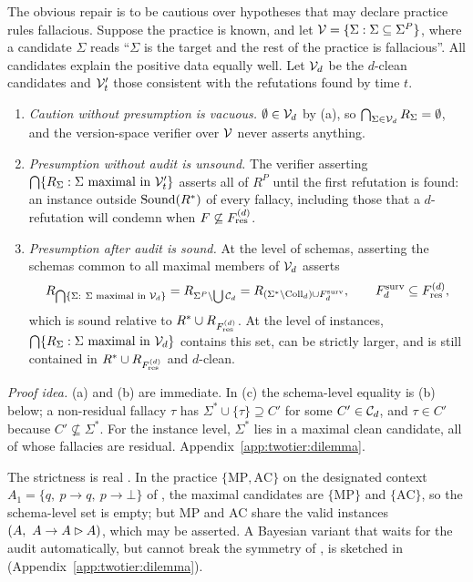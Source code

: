 The obvious repair is to be cautious over hypotheses that may declare practice rules fallacious. Suppose the practice is known, and let $\mathcal{V}=\{\Sigma:\Sigma\subseteq\Sigma^P\}$, where a candidate $\Sigma$ reads ``$\Sigma$ is the target and the rest of the practice is fallacious''. All candidates explain the positive data equally well. Let $\mathcal{V}_d$ be the $d$-clean candidates and $\mathcal{V}'_t$ those consistent with the refutations found by time $t$.

\begin{proposition}\label{prop:twotier:dilemma}
\leavevmode
\begin{enumerate}[label=(\alph*),leftmargin=*]
\item \emph{Caution without presumption is vacuous.} $\emptyset\in\mathcal{V}_d$ by (a), so $\bigcap_{\Sigma\in\mathcal{V}_d}R_\Sigma=\emptyset$, and the version-space verifier over $\mathcal{V}$ never asserts anything.
\item \emph{Presumption without audit is unsound.} The verifier asserting $\bigcap\{R_\Sigma:\Sigma\text{ maximal in }\mathcal{V}'_t\}$ asserts all of $R^P$ until the first refutation is found: an instance outside $\mathrm{Sound}(R^{*})$ of every fallacy, including those that a $d$-refutation will condemn when $F\not\subseteq F^{(d)}_{\mathrm{res}}$.
\item \emph{Presumption after audit is sound.} At the level of schemas, asserting the schemas common to all maximal members of $\mathcal{V}_d$ asserts
\[
R_{\bigcap\{\Sigma:\ \Sigma\text{ maximal in }\mathcal{V}_d\}}=R_{\Sigma^P\setminus\bigcup\mathcal{C}_d}=R_{(\Sigma^*\setminus\mathrm{Coll}_d)\cup F^{\mathrm{surv}}_{d}},\qquad F^{\mathrm{surv}}_{d}\subseteq F^{(d)}_{\mathrm{res}},
\]
which is sound relative to $R^{*}\cup R_{F^{(d)}_{\mathrm{res}}}$. At the level of instances, $\bigcap\{R_\Sigma:\Sigma\text{ maximal in }\mathcal{V}_d\}$ contains this set, can be strictly larger, and is still contained in $R^{*}\cup R_{F^{(d)}_{\mathrm{res}}}$ and $d$-clean.
\end{enumerate}
\end{proposition}

\noindent\emph{Proof idea.} (a) and (b) are immediate. In (c) the schema-level equality is (b) below; a non-residual fallacy $\tau$ has $\Sigma^*\cup\{\tau\}\supseteq C'$ for some $C'\in\mathcal{C}_d$, and $\tau\in C'$ because $C'\not\subseteq\Sigma^*$. For the instance level, $\Sigma^*$ lies in a maximal clean candidate, all of whose fallacies are residual. Appendix~\ref{app:twotier:dilemma}.

The strictness is real . In the practice $\{\mathrm{MP},\mathrm{AC}\}$ on the designated context $A_1=\{q,\ p\to q,\ p\to\bot\}$ of , the maximal candidates are $\{\mathrm{MP}\}$ and $\{\mathrm{AC}\}$, so the schema-level set is empty; but MP and AC share the valid instances $(A,\ A\to A\rhd A)$, which may be asserted. A Bayesian variant that waits for the audit automatically, but cannot break the symmetry of , is sketched in  (Appendix~\ref{app:twotier:dilemma}).

